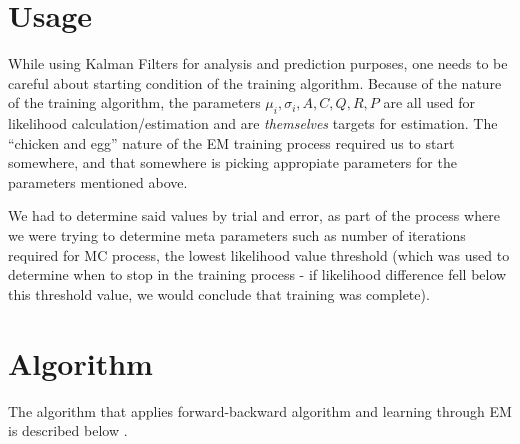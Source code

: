 \section{Usage}

While using Kalman Filters for analysis and prediction purposes, one needs to be
careful about starting condition of the training algorithm. Because of the
nature of the training algorithm, the parameters $\mu_i, \sigma_i,A,C,Q,R,P$ are
all used for likelihood calculation/estimation and are {\em themselves} targets
for estimation. The ``chicken and egg'' nature of the EM training process
required us to start somewhere, and that somewhere is picking appropiate
parameters for the parameters mentioned above.

We had to determine said values by trial and error, as part of the process where
we were trying to determine meta parameters such as number of iterations
required for MC process, the lowest likelihood value threshold (which was used
to determine when to stop in the training process - if likelihood difference
fell below this threshold value, we would conclude that training was complete).

\section{Algorithm}

The algorithm that applies forward-backward algorithm and learning through EM is
described below \cite{ghahramani}.

